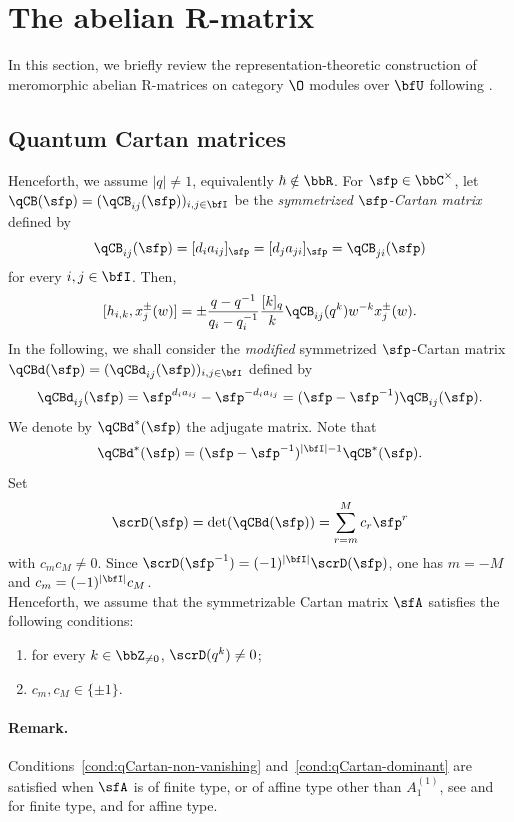 \documentclass[reqno]{amsart}
\numberwithin{equation}{section}
\newenvironment{remark}{\medskip\paragraph{{\bf Remark.}}}{\par\medskip}
\begin{document}

\section{The abelian R-matrix}
\label{s:abelian-R-matrix}

In this section, we briefly review the representation-theoretic construction of 
meromorphic abelian R-matrices on category $\O$ modules over $\bfU$ following 
\cite{appel-gautam-26}.

\subsection{Quantum Cartan matrices}\label{ss:quantum-Cartan}
Henceforth, we assume $|q|\neq1$, equivalently $\hbar\notin\bbR$.
For $\sfp \in \bbC^\times$, let $\qCB(\sfp)=(\qCB_{ij}(\sfp))_{i,j\in\bfI}$ be the
{\em symmetrized $\sfp$-Cartan matrix} defined by
\[\qCB_{ij}(\sfp)=[d_i a_{ij}]_\sfp=[d_j a_{ji}]_\sfp=\qCB_{ji}(\sfp)\]
for every $i,j\in\bfI$. Then,
\[
[h_{i,k},x_j^\pm(w)]=\pm\frac{q-q^{-1}}{q_i-q_i^{-1}}\frac{[k]_q}{k}\qCB_{ij}(q^k) w^{-k} x_j^\pm(w).
\]
In the following, we shall consider the \emph{modified} symmetrized $\sfp$-Cartan matrix
$\qCBd(\sfp)=(\qCBd_{ij}(\sfp))_{i,j\in\bfI}$ defined by
\begin{equation}
\qCBd_{ij}(\sfp)=\sfp^{d_ia_{ij}}-\sfp^{-d_ia_{ij}}=(\sfp-\sfp^{-1})\qCB_{ij}(\sfp).
\end{equation}
We denote by $\qCBd^*(\sfp)$ the adjugate matrix. Note that
\[
\qCBd^*(\sfp)
=
(\sfp-\sfp^{-1})^{|\bfI|-1}\qCB^*(\sfp).
\]
Set
\begin{equation}\label{eq:def-D(p)}
\scrD(\sfp)=\det(\qCBd(\sfp))
=\sum_{r=m}^{M}c_r\sfp^r
\end{equation}
with $c_mc_M\neq0$.
Since
$\scrD(\sfp^{-1})=(-1)^{|\bfI|}\scrD(\sfp)$, one has
$m=-M$ and $c_m=(-1)^{|\bfI|}c_M$.\\

Henceforth, we assume that the symmetrizable Cartan matrix $\sfA$
satisfies the following conditions:
\begin{enumerate}[label=(C\arabic*)]\itemsep0.25cm
\item\label{cond:qCartan-non-vanishing} for every $k\in\bbZ_{\neq0}$, $\scrD(q^k)\neq0$;
\item\label{cond:qCartan-dominant} $c_m,c_M\in\{\pm 1\}$.
\end{enumerate}

\begin{remark}
Conditions~\ref{cond:qCartan-non-vanishing}
and~\ref{cond:qCartan-dominant} are satisfied when $\sfA$ is of finite
type, or of affine type other than $A_1^{(1)}$, see
\cite{khoroshkin-tolstoy-93} and \cite[App.~A]{gautam-toledano-17}
for finite type, and \cite[App.~C]{appel-gautam-wendlandt-26} for
affine type.
\hfill\rmkend
\end{remark}
\end{document}
